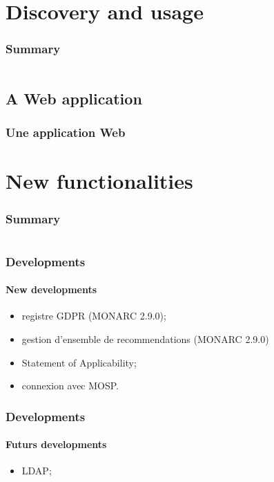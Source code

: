 %
%
\section{Discovery and usage}
\begin{frame}
    \frametitle{Summary}
    \begin{columns}[t]
        \begin{column}{5cm}
            \tableofcontents[sections={1-3}, currentsection, hideothersubsections]
        \end{column}
        \begin{column}{5cm}
            \tableofcontents[sections={4-5}, currentsection, hideothersubsections]
        \end{column}
    \end{columns}
\end{frame}
\subsection{A Web application}
\begin{frame}
    \frametitle{Une application Web}
    \framesubtitle{}
\end{frame}




%
%
\section{New functionalities}
\begin{frame}
    \frametitle{Summary}
    \begin{columns}[t]
        \begin{column}{5cm}
            \tableofcontents[sections={1-3}, currentsection, hideothersubsections]
        \end{column}
        \begin{column}{5cm}
            \tableofcontents[sections={4-5}, currentsection, hideothersubsections]
        \end{column}
    \end{columns}
\end{frame}

\begin{frame}
    \frametitle{Developments}
    \framesubtitle{New developments}
    \begin{itemize}
        \item registre GDPR (MONARC 2.9.0);
        \item gestion d'ensemble de recommendations (MONARC 2.9.0)
        \item Statement of Applicability;
        \item connexion avec MOSP.
    \end{itemize}
\end{frame}

\begin{frame}
    \frametitle{Developments}
    \framesubtitle{Futurs developments}
    \begin{itemize}
        \item LDAP;
        
    \end{itemize}
\end{frame}
